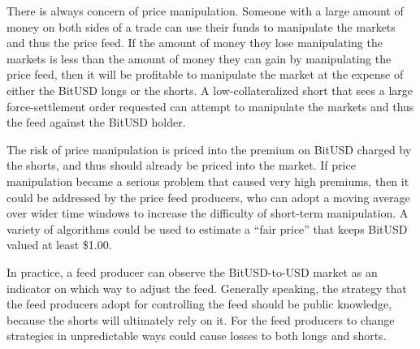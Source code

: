 There is always concern of price manipulation. Someone with a large amount of
money on both sides of a trade can use their funds to manipulate the markets
and thus the price feed. If the amount of money they lose manipulating the
markets is less than the amount of money they can gain by manipulating the
price feed, then it will be profitable to manipulate the market at the expense
of either the BitUSD longs or the shorts. A low-collateralized short that sees
a large force-settlement order requested can attempt to manipulate the markets
and thus the feed against the BitUSD holder.

The risk of price manipulation is priced into the premium on BitUSD charged by
the shorts, and thus should already be priced into the market. If price
manipulation became a serious problem that caused very high premiums, then it
could be addressed by the price feed producers, who can adopt a moving average
over wider time windows to increase the difficulty of short-term manipulation.
A variety of algorithms could be used to estimate a ``fair price'' that keeps
BitUSD valued at least \$1.00.

In practice, a feed producer can observe the BitUSD-to-USD market as an
indicator on which way to adjust the feed. Generally speaking, the strategy
that the feed producers adopt for controlling the feed should be public
knowledge, because the shorts will ultimately rely on it. For the feed
producers to change strategies in unpredictable ways could cause losses to both
longs and shorts.
